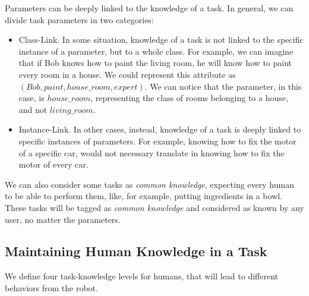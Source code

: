 Parameters can be deeply linked to the knowledge of a task. In general, we can divide task parameters in two categories:
\begin{itemize}
\item Class-Link. In some situation, knowledge of a task is not linked to the specific instance of a parameter, but to a whole class. For example, we can imagine that if Bob knows how to paint the living room, he will know how to paint every room in a house. We could represent this attribute as $(Bob, paint, house\_room, expert)$. We can notice that the parameter, in this case, is $house\_room$, representing the class of rooms belonging to a house, and not $living\_room$.
\item Instance-Link. In other cases, instead, knowledge of a task is deeply linked to specific instances of parameters. For example, knowing how to fix the motor of a specific car, would not necessary translate in knowing how to fix the motor of every car.
\end{itemize}

We can also consider some tasks as \textit{common knowledge}, expecting every human to be able to perform them, like, for example, putting ingredients in a bowl. These tasks will be tagged as \textit{common knowledge} and considered as known by any user, no matter the parameters. 

\subsection{Maintaining Human Knowledge in a Task}
We define four task-knowledge levels for humans, that will lead to different behaviors from the robot.

